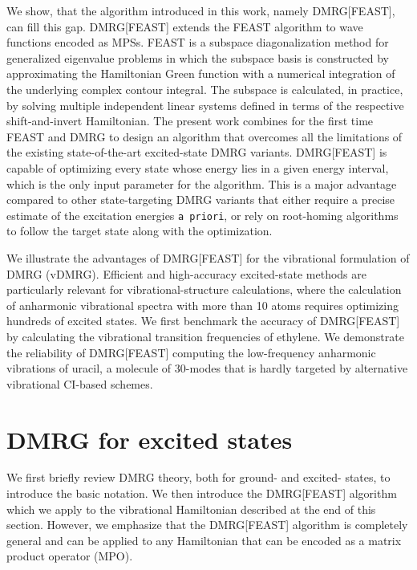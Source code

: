 \documentclass[journal=jctcce]{achemso}
\begin{document}
We show, that the algorithm introduced in this work, namely DMRG[FEAST], can fill this gap.
DMRG[FEAST] extends the FEAST algorithm\cite{Polizzi2009_FEAST,Polizzi2014_FEAST-Iterative,Polizzi2015_FEAST-Zolotarev,Polizzi2016_FEAST-NonHermitian} to wave functions encoded as MPSs.
FEAST is a subspace diagonalization method for generalized eigenvalue problems in which the subspace basis is constructed by approximating the Hamiltonian Green function with a numerical integration of the underlying complex contour integral.
The subspace is calculated, in practice, by solving multiple independent linear systems defined in terms of the respective shift-and-invert Hamiltonian.\cite{Oseledets2012_ALS,Holz2012_ALSTheory,Kuprov2014_TensorTrain-NMR,Oseledts2016}
The present work combines for the first time FEAST and DMRG to design an algorithm that overcomes all the limitations of the existing state-of-the-art excited-state DMRG variants.
DMRG[FEAST] is capable of optimizing every state whose energy lies in a given energy interval, which is the only input parameter for the algorithm.
This is a major advantage compared to other state-targeting DMRG variants that either require a precise estimate of the excitation energies \texttt{a priori}, or rely on root-homing algorithms to follow the target state along with the optimization.\cite{Butscher1976_RootHoming,Baiardi2019_HighEnergy-vDMRG}

We illustrate the advantages of DMRG[FEAST] for the vibrational formulation of DMRG (vDMRG).\cite{Baiardi2017_VDMRG,Baiardi2019_HighEnergy-vDMRG}
Efficient and high-accuracy excited-state methods are particularly relevant for vibrational-structure calculations, where the calculation of anharmonic vibrational spectra with more than 10 atoms requires optimizing hundreds of excited states. 
We first benchmark the accuracy of DMRG[FEAST] by calculating the vibrational transition frequencies of ethylene.\cite{Delahaye2014_EthylenePES}
We demonstrate the reliability of DMRG[FEAST] computing the low-frequency anharmonic vibrations of uracil,\cite{Carrington2018_Uracil} a molecule of 30-modes that is hardly targeted by alternative vibrational CI-based schemes.

\section{DMRG for excited states}
\label{sec:theory}

We first briefly review DMRG theory, both for ground-\cite{Baiardi2017_VDMRG} and excited-\cite{Baiardi2019_HighEnergy-vDMRG} states, to introduce the basic notation.
We then introduce the DMRG[FEAST] algorithm which we apply to the vibrational Hamiltonian described at the end of this section.
However, we emphasize that the DMRG[FEAST] algorithm is completely general and can be applied to any Hamiltonian that can be encoded as a matrix product operator (MPO).
\end{document}
